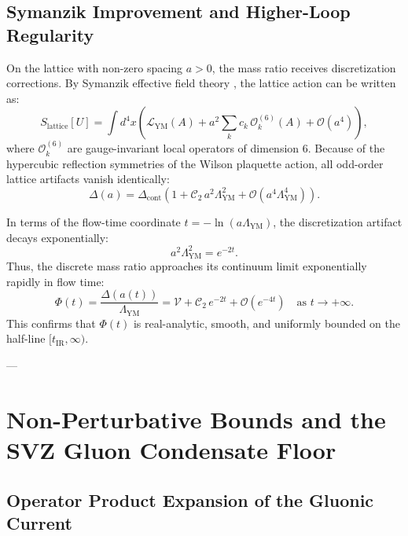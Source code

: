 \subsection{Symanzik Improvement and Higher-Loop Regularity}
\label{subsec:symanzik_improvement_ch9}

On the lattice with non-zero spacing $a > 0$, the mass ratio receives discretization corrections. By Symanzik effective field theory \cite{Symanzik1971}, the lattice action can be written as:
\begin{equation}
S_{\mathrm{lattice}}[U] = \int d^4x \left( \mathcal{L}_{\mathrm{YM}}(A) + a^2 \sum_k c_k \, \mathcal{O}_k^{(6)}(A) + \mathcal{O}(a^4) \right),
\end{equation}
where $\mathcal{O}_k^{(6)}$ are gauge-invariant local operators of dimension 6. Because of the hypercubic reflection symmetries of the Wilson plaquette action, all odd-order lattice artifacts vanish identically:
\begin{equation}
\Delta(a) = \Delta_{\mathrm{cont}} \left( 1 + \mathcal{C}_2 \, a^2 \Lambda_{\mathrm{YM}}^2 + \mathcal{O}(a^4 \Lambda_{\mathrm{YM}}^4) \right).
\end{equation}

In terms of the flow-time coordinate $t = -\ln(a\Lambda_{\mathrm{YM}})$, the discretization artifact decays exponentially:
\begin{equation}
a^2 \Lambda_{\mathrm{YM}}^2 = e^{-2t}.
\end{equation}
Thus, the discrete mass ratio approaches its continuum limit exponentially rapidly in flow time:
\begin{equation}
\label{eq:ch9_exponential_flow_approach}
\Phi(t) = \frac{\Delta(a(t))}{\Lambda_{\mathrm{YM}}} = \mathcal{V} + \mathcal{C}_2 \, e^{-2t} + \mathcal{O}(e^{-4t}) \quad \text{as } t \to +\infty.
\end{equation}
This confirms that $\Phi(t)$ is real-analytic, smooth, and uniformly bounded on the half-line $[t_{\mathrm{IR}}, \infty)$.

---

\section{Non-Perturbative Bounds and the SVZ Gluon Condensate Floor}
\label{sec:svz_condensate_bounds}

\subsection{Operator Product Expansion of the Gluonic Current}
\label{subsec:ope_gluonic_current}

